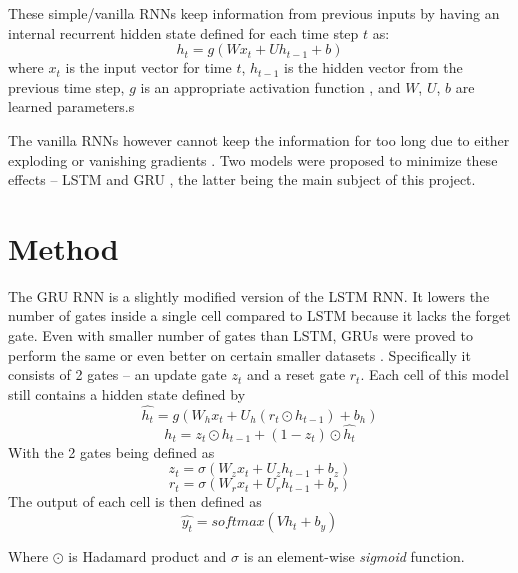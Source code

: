\documentclass[11pt]{article}
\begin{document}
		These simple/vanilla RNNs keep information from previous inputs by having an internal recurrent hidden state defined for each time step $t$ as:
		\begin{equation}
			h_t = g(Wx_t + Uh_{t-1} + b)
		\end{equation}
		where $x_t$ is the input vector for time $t$, $h_{t-1}$ is the hidden vector from the previous time step, $g$ is an appropriate activation function , and $W$, $U$, $b$  are learned parameters.s
		
		The vanilla RNNs however cannot keep the information for too long due to either exploding or vanishing gradients \cite{bengio1994learning}. Two models were proposed to minimize these effects -- LSTM \cite{hochreiter1997long} and GRU \cite{cho2014learning}, the latter being the main subject of this project.
	
	\section{Method} \label{sec:gru-intro}
		The GRU RNN is a slightly modified version of the LSTM RNN. It lowers the number of gates inside a single cell compared to LSTM because it lacks the forget gate. Even with smaller number of gates than LSTM, GRUs were proved to perform the same or even better on certain smaller datasets \cite{chung2014empirical}. Specifically it consists of 2 gates -- an update gate $z_t$ and a reset gate $r_t$. Each cell of this model still contains a hidden state defined by
		\begin{equation}\label{eq:gru-h_hat}
			\hat{h_t} = g(W_hx_t+U_h(r_t \odot h_{t-1}) + b_h)
		\end{equation}
		\begin{equation}\label{eq:gru-h}
			h_t = z_t \odot h_{t-1} + (1-z_t) \odot \hat{h_t}
		\end{equation}
		With the 2 gates being defined as
		\begin{equation}\label{eq:gru-z}
			z_t = \sigma (W_zx_t + U_zh_{t-1} + b_z)
		\end{equation}
		\begin{equation}\label{eq:gru-r}
			r_t = \sigma (W_rx_t + U_rh_{t-1} + b_r)
		\end{equation}
		The output of each cell is then defined as
		\begin{equation}
			\hat{y_t} = softmax(Vh_t + b_y)
		\end{equation}
	
		Where $\odot$ is Hadamard product and $\sigma$ is an element-wise \textit{sigmoid} function.
		
\end{document}
